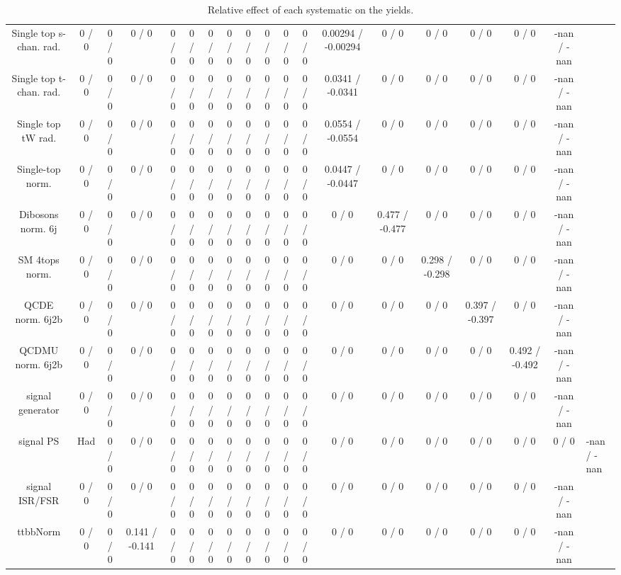 \documentclass[10pt]{article}
\begin{document}
\begin{table}[htbp]
\begin{center}
\begin{tabular}{|c|c|c|c|c|c|c|c|c|c|c|c|c|c|c|c|c|c|}
  Single top s-chan. rad. & 0 / 0 & 0 / 0 & 0 / 0 & 0 / 0 & 0 / 0 & 0 / 0 & 0 / 0 & 0 / 0 & 0 / 0 & 0 / 0 & 0 / 0 & 0.00294 / -0.00294 & 0 / 0 & 0 / 0 & 0 / 0 & 0 / 0 & -nan / -nan \\ 
  Single top t-chan. rad. & 0 / 0 & 0 / 0 & 0 / 0 & 0 / 0 & 0 / 0 & 0 / 0 & 0 / 0 & 0 / 0 & 0 / 0 & 0 / 0 & 0 / 0 & 0.0341 / -0.0341 & 0 / 0 & 0 / 0 & 0 / 0 & 0 / 0 & -nan / -nan \\ 
  Single top tW rad. & 0 / 0 & 0 / 0 & 0 / 0 & 0 / 0 & 0 / 0 & 0 / 0 & 0 / 0 & 0 / 0 & 0 / 0 & 0 / 0 & 0 / 0 & 0.0554 / -0.0554 & 0 / 0 & 0 / 0 & 0 / 0 & 0 / 0 & -nan / -nan \\ 
  Single-top norm. & 0 / 0 & 0 / 0 & 0 / 0 & 0 / 0 & 0 / 0 & 0 / 0 & 0 / 0 & 0 / 0 & 0 / 0 & 0 / 0 & 0 / 0 & 0.0447 / -0.0447 & 0 / 0 & 0 / 0 & 0 / 0 & 0 / 0 & -nan / -nan \\ 
  Dibosons norm. 6j & 0 / 0 & 0 / 0 & 0 / 0 & 0 / 0 & 0 / 0 & 0 / 0 & 0 / 0 & 0 / 0 & 0 / 0 & 0 / 0 & 0 / 0 & 0 / 0 & 0.477 / -0.477 & 0 / 0 & 0 / 0 & 0 / 0 & -nan / -nan \\ 
  SM 4tops norm. & 0 / 0 & 0 / 0 & 0 / 0 & 0 / 0 & 0 / 0 & 0 / 0 & 0 / 0 & 0 / 0 & 0 / 0 & 0 / 0 & 0 / 0 & 0 / 0 & 0 / 0 & 0.298 / -0.298 & 0 / 0 & 0 / 0 & -nan / -nan \\ 
  QCDE norm. 6j2b & 0 / 0 & 0 / 0 & 0 / 0 & 0 / 0 & 0 / 0 & 0 / 0 & 0 / 0 & 0 / 0 & 0 / 0 & 0 / 0 & 0 / 0 & 0 / 0 & 0 / 0 & 0 / 0 & 0.397 / -0.397 & 0 / 0 & -nan / -nan \\ 
  QCDMU norm. 6j2b & 0 / 0 & 0 / 0 & 0 / 0 & 0 / 0 & 0 / 0 & 0 / 0 & 0 / 0 & 0 / 0 & 0 / 0 & 0 / 0 & 0 / 0 & 0 / 0 & 0 / 0 & 0 / 0 & 0 / 0 & 0.492 / -0.492 & -nan / -nan \\ 
  signal generator & 0 / 0 & 0 / 0 & 0 / 0 & 0 / 0 & 0 / 0 & 0 / 0 & 0 / 0 & 0 / 0 & 0 / 0 & 0 / 0 & 0 / 0 & 0 / 0 & 0 / 0 & 0 / 0 & 0 / 0 & 0 / 0 & -nan / -nan \\ 
  signal PS & Had & 0 / 0 & 0 / 0 & 0 / 0 & 0 / 0 & 0 / 0 & 0 / 0 & 0 / 0 & 0 / 0 & 0 / 0 & 0 / 0 & 0 / 0 & 0 / 0 & 0 / 0 & 0 / 0 & 0 / 0 & 0 / 0 & -nan / -nan \\ 
  signal ISR/FSR & 0 / 0 & 0 / 0 & 0 / 0 & 0 / 0 & 0 / 0 & 0 / 0 & 0 / 0 & 0 / 0 & 0 / 0 & 0 / 0 & 0 / 0 & 0 / 0 & 0 / 0 & 0 / 0 & 0 / 0 & 0 / 0 & -nan / -nan \\ 
 ttbbNorm & 0 / 0 & 0 / 0 & 0.141 / -0.141 & 0 / 0 & 0 / 0 & 0 / 0 & 0 / 0 & 0 / 0 & 0 / 0 & 0 / 0 & 0 / 0 & 0 / 0 & 0 / 0 & 0 / 0 & 0 / 0 & 0 / 0 & -nan / -nan \\ 
\hline 
\end{tabular} 
\caption{Relative effect of each systematic on the yields.} 
\end{center} 
\end{table} 
\end{document}
